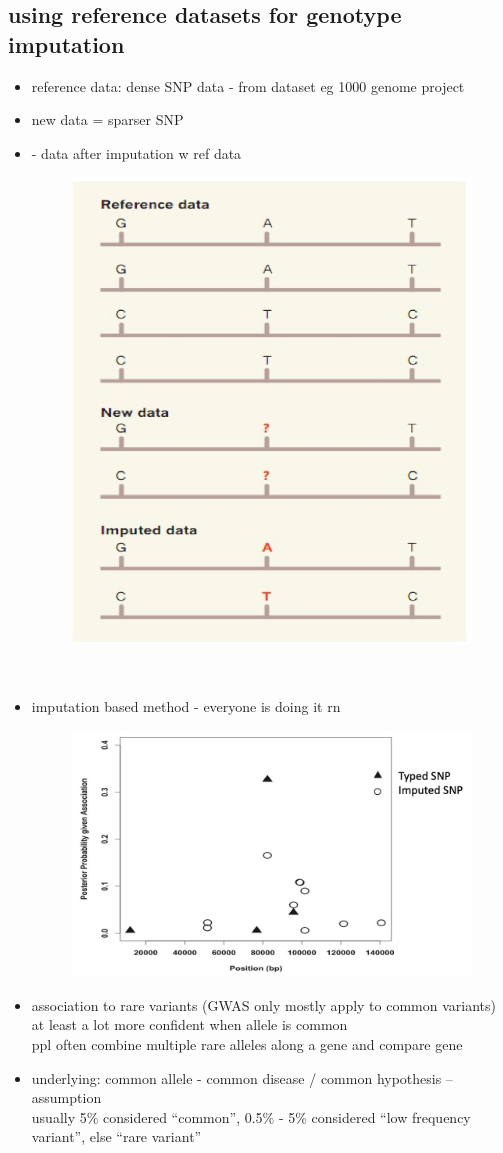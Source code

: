 \documentclass[font=12pt]{article}
\begin{document}
\subsection{using reference datasets for genotype imputation}
\begin{itemize}
	\item reference data: dense SNP data - from dataset eg 1000 genome project
	\item new data = sparser SNP
	\item {} - data after imputation w ref data\begin{figure}[h!]
		\includegraphics[width=0.3\linewidth]{imputation_data}
		\label{fig:imputationdata}
	\end{figure}\\
	\item imputation based method - everyone is doing it rn \begin{figure}[h!]
		\includegraphics[width=0.5\linewidth]{imputation}
		\label{fig:imputation}
	\end{figure}
	\item association to rare variants (GWAS only mostly apply to common variants)\\
	at least a lot more confident when allele is common\\
	ppl often combine multiple rare alleles along a gene and compare gene
	\item underlying: common allele - common disease / common hypothesis -- assumption \\
	usually 5\% considered ``common'', 0.5\% - 5\% considered ``low frequency variant'', else ``rare variant''

\end{itemize}
\end{document}
